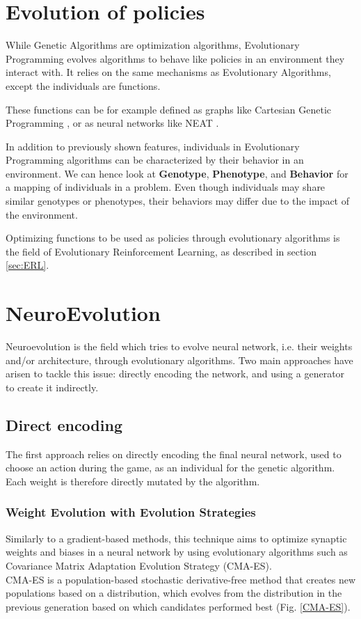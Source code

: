 \section{Evolution of policies}

While Genetic Algorithms are optimization algorithms, Evolutionary Programming evolves algorithms to behave like policies in an environment they interact with. It relies on the same mechanisms as Evolutionary Algorithms, except the individuals are functions. 

These functions can be for example defined as graphs like Cartesian Genetic Programming \cite{CGP}, or as neural networks like NEAT \cite{NEAT_1}.

In addition to previously shown features, individuals in Evolutionary Programming algorithms can be characterized by their behavior in an environment. We can hence look at \textbf{Genotype}, \textbf{Phenotype}, and \textbf{Behavior} for a mapping of individuals in a problem. Even though individuals may share similar genotypes or phenotypes, their behaviors may differ due to the impact of the environment. 

Optimizing functions to be used as policies through evolutionary algorithms is the field of Evolutionary Reinforcement Learning, as described in section \ref{sec:ERL}.

\section{NeuroEvolution}

Neuroevolution is the field which tries to evolve neural network, i.e. their weights and/or architecture, through evolutionary algorithms. Two main approaches have arisen to tackle this issue: directly encoding the network, and using a generator to create it indirectly.

\subsection{Direct encoding}
The first approach relies on directly encoding the final neural network, used to choose an action during the game, as an individual for the genetic algorithm. Each weight is therefore directly mutated by the algorithm.

\subsubsection{Weight Evolution with Evolution Strategies}
Similarly to a gradient-based methods, this technique aims to optimize synaptic weights and biases in a neural network by using evolutionary algorithms such as Covariance Matrix Adaptation Evolution Strategy (CMA-ES). \cite{CMA-ES} \cite{CMAES-Atari}\\ 
CMA-ES is a population-based stochastic derivative-free method that creates new populations based on a distribution, which evolves from the distribution in the previous generation based on which candidates performed best (Fig. \ref{CMA-ES}).


